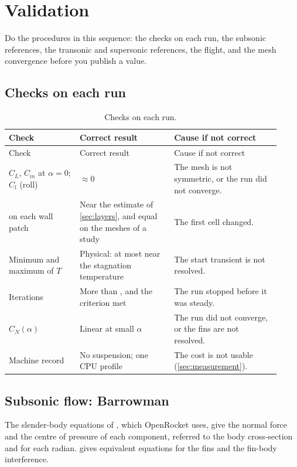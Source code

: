 \chapter{Validation}\label{ch:validation}

Do the procedures in this sequence: the checks on each run, the subsonic references,
the transonic and supersonic references, the flight, and the mesh convergence before you
publish a value.

\section{Checks on each run}\label{sec:run-checks}

\begin{longtable}{@{}P{0.24\linewidth} P{0.32\linewidth} P{0.36\linewidth}@{}}
\caption{Checks on each run.}\label{tab:run-checks}\\
\toprule
Check & Correct result & Cause if not correct \\
\midrule
\endfirsthead
\toprule
Check & Correct result & Cause if not correct \\
\midrule
\endhead
$C_L$, $C_m$ at $\alpha = 0$; $C_l$ (roll) & $\approx 0$ & The mesh is not symmetric, or the run did not converge. \\
\yplus{} on each wall patch & Near the estimate of \cref{sec:layers}, and equal on the meshes of a study & The first cell changed. \\
Minimum and maximum of $T$ & Physical: at most near the stagnation temperature & The start transient is not resolved. \\
Iterations & More than , and the criterion met & The run stopped before it was steady. \\
$C_N(\alpha)$ & Linear at small $\alpha$ & The run did not converge, or the fins are not resolved. \\
Machine record & No suspension; one CPU profile & The cost is not usable (\cref{sec:measurement}). \\
\bottomrule
\end{longtable}

\section{Subsonic flow: Barrowman}\label{sec:barrowman}

The slender-body equations of \citet{barrowman1967,barrowman1966}, which OpenRocket
uses, give the normal force and the centre of pressure of each component, referred to
the body cross-section and for each radian. \citet[ch.~2]{fleeman2012} gives equivalent
equations for the fins and the fin-body interference.

